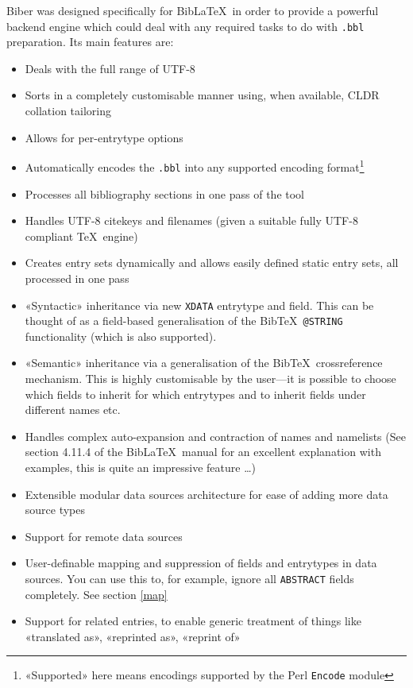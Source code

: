 \documentclass{ltxdockit}
\begin{document}
Biber was designed specifically for Bib\LaTeX\ in order to
provide a powerful backend engine which could deal with any required
tasks to do with \verb+.bbl+ preparation. Its main features are:

\begin{itemize}
\item Deals with the full range of UTF-8
\item Sorts in a completely customisable manner using, when available,
  CLDR collation tailoring
\item Allows for per-entrytype options
\item Automatically encodes the \verb+.bbl+ into any supported encoding
  format\footnote{«Supported» here means encodings supported by the
    Perl \texttt{Encode} module}
\item Processes all bibliography sections in one pass of the tool
\item Handles UTF-8 citekeys and filenames (given a suitable fully
  UTF-8 compliant \TeX\ engine)
\item Creates entry sets dynamically and allows easily defined static entry sets,
  all processed in one pass
\item «Syntactic» inheritance via new \verb+XDATA+ entrytype and
  field. This can be thought of as a field-based generalisation of the
  Bib\TeX\ \verb+@STRING+ functionality (which is also supported).
\item «Semantic» inheritance via a generalisation of the Bib\TeX\
  crossreference mechanism. This is highly customisable by the
  user---it is possible to choose which fields to inherit for which
  entrytypes and to inherit fields under different names etc.
\item Handles complex auto-expansion and contraction of names and
  namelists (See section 4.11.4 of the Bib\LaTeX\ manual for an excellent
  explanation with examples, this is quite an impressive feature \ldots)
\item Extensible modular data sources architecture for ease of adding
  more data source types
\item Support for remote data sources
\item User-definable mapping and suppression of fields and entrytypes in
  data sources. You can use this to, for example, ignore all
  \verb+ABSTRACT+ fields completely. See section \ref{map}
\item Support for related entries, to enable generic treatment of things
  like «translated as», «reprinted as», «reprint of»

\end{itemize}
\end{document}
